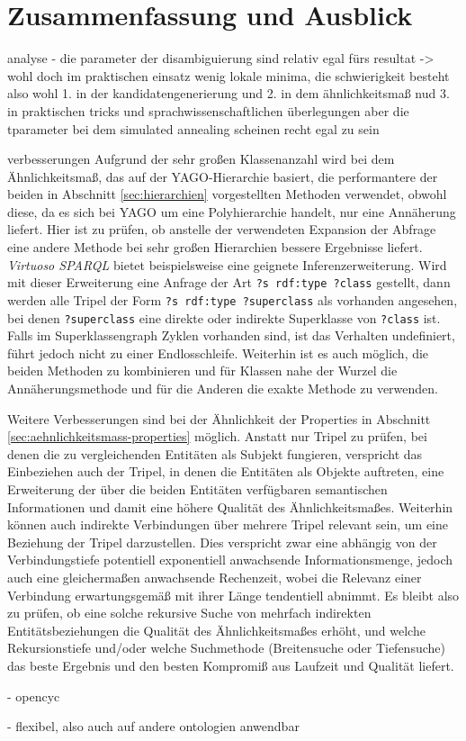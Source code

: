\chapter{Zusammenfassung und Ausblick}\label{zusammenfassung_und_ausblick}

analyse
- die parameter der disambiguierung sind relativ egal fürs resultat
-> wohl doch im praktischen einsatz wenig lokale minima, die schwierigkeit besteht also wohl 
1. in der kandidatengenerierung und 2. in dem ähnlichkeitsmaß nud 3. in praktischen tricks und sprachwissenschaftlichen überlegungen 
aber die tparameter bei dem simulated annealing scheinen recht egal zu sein

verbesserungen
Aufgrund der sehr großen Klassenanzahl wird bei dem Ähnlichkeitsmaß, das auf der YAGO-Hierarchie basiert, die performantere der beiden in Abschnitt \ref{sec:hierarchien} vorgestellten Methoden verwendet,
obwohl diese, da es sich bei YAGO um eine Polyhierarchie handelt, nur eine Annäherung liefert.
Hier ist zu prüfen, ob anstelle der verwendeten Expansion der Abfrage eine andere Methode bei sehr großen Hierarchien bessere Ergebnisse liefert.
\emph{Virtuoso SPARQL} bietet beispielsweise eine geignete Inferenzerweiterung.
Wird mit dieser Erweiterung eine Anfrage der Art \texttt{?s rdf:type ?class} gestellt, dann werden alle Tripel der Form \texttt{?s rdf:type ?superclass} als vorhanden angesehen, bei denen \texttt{?superclass} eine direkte oder indirekte Superklasse
von \texttt{?class} ist. Falls im Superklassengraph Zyklen vorhanden sind, ist das Verhalten undefiniert, führt jedoch nicht zu einer Endlosschleife.\footnotemark{}
Weiterhin ist es auch möglich, die beiden Methoden zu kombinieren und für Klassen nahe der Wurzel die Annäherungsmethode und für die Anderen die exakte Methode zu verwenden.

Weitere Verbesserungen sind bei der Ähnlichkeit der Properties in Abschnitt \ref{sec:aehnlichkeitsmass-properties} möglich.
Anstatt nur Tripel zu prüfen, bei denen die zu vergleichenden Entitäten als Subjekt fungieren, verspricht das Einbeziehen auch der Tripel, in denen die Entitäten als Objekte auftreten, eine Erweiterung der über
die beiden Entitäten verfügbaren semantischen Informationen und damit eine höhere Qualität des Ähnlichkeitsmaßes.
Weiterhin können auch indirekte Verbindungen über mehrere Tripel relevant sein, um eine Beziehung der Tripel darzustellen.
Dies verspricht zwar eine abhängig von der Verbindungstiefe potentiell exponentiell anwachsende Informationsmenge, jedoch auch eine gleichermaßen anwachsende Rechenzeit, wobei die Relevanz einer Verbindung 
erwartungsgemäß mit ihrer Länge tendentiell abnimmt. Es bleibt also zu prüfen, ob eine solche rekursive Suche von mehrfach indirekten Entitätsbeziehungen die Qualität des Ähnlichkeitsmaßes erhöht,
und welche Rekursionstiefe und/oder welche Suchmethode (\zb Breitensuche oder Tiefensuche) das beste Ergebnis und den besten Kompromiß aus Laufzeit und Qualität liefert.



- opencyc

- flexibel, also auch auf andere ontologien anwendbar
